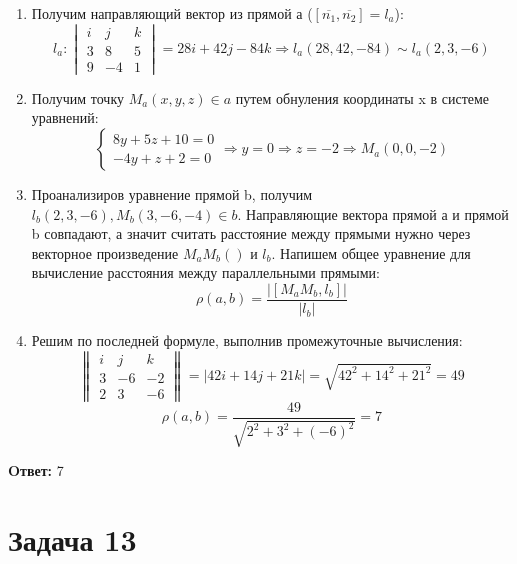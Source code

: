\documentclass{article}
\begin{document}
\begin{enumerate}
  \item Получим направляющий вектор из прямой а ($[\overline{n_1},\overline{n_2}] = l_a$):
    \[
      l_a: 
      \begin{vmatrix}
        i &j &k \\ 
        3 &8 &5\\ 
        9 &-4 &1
      \end{vmatrix}
    = 28i + 42j -84k \Rightarrow l_a(28,42,-84) \sim l_a(2,3,-6)\]
  \item Получим точку $M_a(x,y,z) \in a$ путем обнуления координаты x в системе уравнений:
    \[
      \begin{cases}
        8y + 5z + 10 = 0\\ 
        -4y + z + 2 = 0 
      \end{cases}
    \Rightarrow y = 0 \Rightarrow z = -2 \Rightarrow M_a(0,0,-2)\]
  \item Проанализиров уравнение прямой b, получим $l_b(2,3,-6), M_b(3,-6,-4) \in b$. Направляющие
    вектора прямой а и прямой b совпадают, а значит считать расстояние между прямыми нужно через 
    векторное произведение $M_aM_b()$ и $l_b$. Напишем общее уравнение для вычисление расстояния между
    параллельными прямыми:
    \[
      \rho(a,b) = \frac{|[M_aM_b, l_b]|}{|l_b|} 
    \]
  \item Решим по последней формуле, выполнив промежуточные вычисления:
    \[
      \begin{Vmatrix}
        i &j &k\\ 
        3 &-6 &-2\\ 
        2 &3 &-6
      \end{Vmatrix} = |42i + 14j + 21k| = \sqrt{42^2 + 14^2 + 21^2} = 49\]\[
      \rho(a,b) = \frac{49}{\sqrt{2^2+3^2+(-6)^2}} = 7 
    \]
\end{enumerate}

\textbf{Oтвет: }7


\section*{Задача 13}
\end{document}
